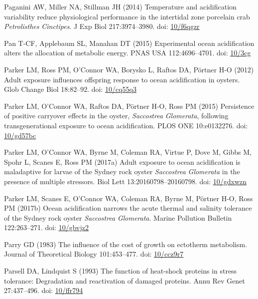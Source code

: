 \documentclass[a4paper,10pt, oneside]{memoir}
\begin{document}
\leavevmode\hypertarget{ref-Paganini2014}{}%
Paganini AW, Miller NA, Stillman JH (2014) Temperature and acidification variability reduce physiological performance in the intertidal zone porcelain crab \emph{Petrolisthes} \emph{Cinctipes}. J Exp Biol 217:3974--3980. doi: \href{https://doi.org/10/f6qgzr}{10/f6qgzr}

\leavevmode\hypertarget{ref-Pan2015}{}%
Pan T-CF, Applebaum SL, Manahan DT (2015) Experimental ocean acidification alters the allocation of metabolic energy. PNAS USA 112:4696--4701. doi: \href{https://doi.org/10/3cg}{10/3cg}

\leavevmode\hypertarget{ref-Parker2012}{}%
Parker LM, Ross PM, O'Connor WA, Borysko L, Raftos DA, Pörtner H-O (2012) Adult exposure influences offspring response to ocean acidification in oysters. Glob Change Biol 18:82--92. doi: \href{https://doi.org/10/cq55q3}{10/cq55q3}

\leavevmode\hypertarget{ref-Parker2015}{}%
Parker LM, O'Connor WA, Raftos DA, Pörtner H-O, Ross PM (2015) Persistence of positive carryover effects in the oyster, \emph{Saccostrea} \emph{Glomerata}, following transgenerational exposure to ocean acidification. PLOS ONE 10:e0132276. doi: \href{https://doi.org/10/gd57bc}{10/gd57bc}

\leavevmode\hypertarget{ref-Parker2017}{}%
Parker LM, O'Connor WA, Byrne M, Coleman RA, Virtue P, Dove M, Gibbs M, Spohr L, Scanes E, Ross PM (2017a) Adult exposure to ocean acidification is maladaptive for larvae of the Sydney rock oyster \emph{Saccostrea} \emph{Glomerata} in the presence of multiple stressors. Biol Lett 13:20160798--20160798. doi: \href{https://doi.org/10/gdxwzn}{10/gdxwzn}

\leavevmode\hypertarget{ref-Parker2017a}{}%
Parker LM, Scanes E, O'Connor WA, Coleman RA, Byrne M, Pörtner H-O, Ross PM (2017b) Ocean acidification narrows the acute thermal and salinity tolerance of the Sydney rock oyster \emph{Saccostrea} \emph{Glomerata}. Marine Pollution Bulletin 122:263--271. doi: \href{https://doi.org/10/gbvjz2}{10/gbvjz2}

\leavevmode\hypertarget{ref-Parry1983}{}%
Parry GD (1983) The influence of the cost of growth on ectotherm metabolism. Journal of Theoretical Biology 101:453--477. doi: \href{https://doi.org/10/ccz9r7}{10/ccz9r7}

\leavevmode\hypertarget{ref-Parsell1993}{}%
Parsell DA, Lindquist S (1993) The function of heat-shock proteins in stress tolerance: Degradation and reactivation of damaged proteins. Annu Rev Genet 27:437--496. doi: \href{https://doi.org/10/ffr794}{10/ffr794}
\end{document}
